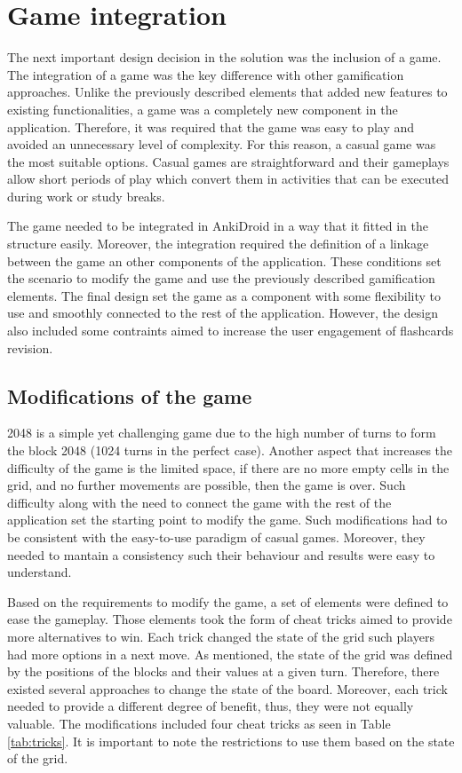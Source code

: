 \section{Game integration}
\label{game-integration}
The next important design decision in the solution was the inclusion of a game. The integration of a game was the key difference with other gamification approaches. Unlike the previously described elements that added new features to existing functionalities, a game was a completely new component in the application. Therefore, it was required that the game was easy to play and avoided an unnecessary level of complexity. For this reason, a casual game was the most suitable options. Casual games are straightforward and their gameplays allow short periods of play which convert them in activities that can be executed during work or study breaks.

The game needed to be integrated in AnkiDroid in a way that it fitted in the structure easily. Moreover, the integration required the definition of a linkage between the game an other components of the application. These conditions set the scenario to modify the game and use the previously described gamification elements. The final design set the game as a component with some flexibility to use and smoothly connected to the rest of the application. However, the design also included some contraints aimed to increase the user engagement of flashcards revision.

\subsection{Modifications of the game}
2048 is a simple yet challenging game due to the high number of turns to form the block 2048 (1024 turns in the perfect case). Another aspect that increases the difficulty of the game is the limited space, if there are no more empty cells in the grid, and no further movements are possible, then the game is over. Such difficulty along with the need to connect the game with the rest of the application set the starting point to modify the game. Such modifications had to be consistent with the easy-to-use paradigm of casual games. Moreover, they needed to mantain a consistency such their behaviour and results were easy to understand.

Based on the requirements to modify the game, a set of elements were defined to ease the gameplay. Those elements took the form of cheat tricks aimed to provide more alternatives to win. Each trick changed the state of the grid such players had more options in a next move. As mentioned, the state of the grid was defined by the positions of the blocks and their values at a given turn. Therefore, there existed several approaches to change the state of the board. Moreover, each trick needed to provide a different degree of benefit, thus, they were not equally valuable. The modifications included four cheat tricks as seen in Table \ref{tab:tricks}. It is important to note the restrictions to use them based on the state of the grid.

